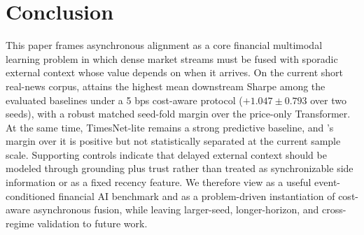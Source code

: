 \section{Conclusion}
\label{sec:conclusion}

This paper frames asynchronous alignment as a core financial multimodal learning problem in which dense market streams must be fused with sporadic external context whose value depends on when it arrives. On the current short real-news corpus, \CGCMA{} attains the highest mean downstream Sharpe among the evaluated baselines under a 5 bps cost-aware protocol ($+1.047\pm0.793$ over two seeds), with a robust matched seed-fold margin over the price-only Transformer. At the same time, TimesNet-lite remains a strong predictive baseline, and \CGCMA{}'s margin over it is positive but not statistically separated at the current sample scale. Supporting controls indicate that delayed external context should be modeled through grounding plus trust rather than treated as synchronizable side information or as a fixed recency feature. We therefore view \dataset{} as a useful event-conditioned financial AI benchmark and \CGCMA{} as a problem-driven instantiation of cost-aware asynchronous fusion, while leaving larger-seed, longer-horizon, and cross-regime validation to future work.
